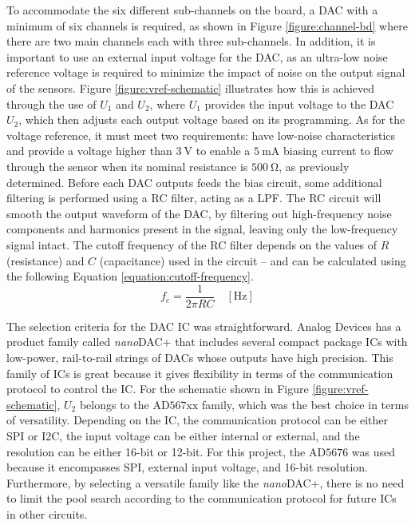 To accommodate the six different sub-channels on the board, a \ac{DAC} with a minimum of six channels is required, as shown in Figure \ref{figure:channel-bd} where there are two main channels each with three sub-channels. In addition, it is important to use an external input voltage for the \ac{DAC}, as an ultra-low noise reference voltage is required to minimize the impact of noise on the output signal of the sensors. Figure \ref{figure:vref-schematic} illustrates how this is achieved through the use of $U_1$ and $U_2$, where $U_1$ provides the input voltage to the \ac{DAC} $U_2$, which then adjusts each output voltage based on its programming. As for the voltage reference, it must meet two requirements: have low-noise characteristics and provide a voltage higher than $\mathrm{3~V}$ to enable a $\mathrm{5~mA}$ biasing current to flow through the sensor when its nominal resistance is $\mathrm{500~\Omega}$, as previously determined. Before each \ac{DAC} outputs feeds the bias circuit, some additional filtering is performed using a \ac{RC} filter, acting as a \ac{LPF}. The \ac{RC} circuit will smooth the output waveform of the \ac{DAC}, by filtering out high-frequency noise components and harmonics present in the signal, leaving only the low-frequency signal intact. The cutoff frequency of the \ac{RC} filter depends on the values of $R$ (resistance) and $C$ (capacitance) used in the circuit -- and can be calculated using the following Equation \ref{equation:cutoff-frequency}.
\begin{equation}
    f_c = \frac{1}{2\pi RC} \quad [\mathrm{Hz}]
    \label{equation:cutoff-frequency}
\end{equation}

The selection criteria for the \ac{DAC} \ac{IC} was straightforward. Analog Devices has a product family called \textit{nano}DAC+ that includes several compact package \ac{IC}s with low-power, rail-to-rail strings of \ac{DAC}s whose outputs have high precision. This family of \ac{IC}s is great because it gives flexibility in terms of the communication protocol to control the \ac{IC}. For the schematic shown in Figure \ref{figure:vref-schematic}, $U_2$ belongs to the $\mathrm{AD567xx}$ family, which was the best choice in terms of versatility. Depending on the \ac{IC}, the communication protocol can be either \ac{SPI} or \ac{I2C}, the input voltage can be either internal or external, and the resolution can be either 16-bit or 12-bit. For this project, the $\mathrm{AD5676}$ was used because it encompasses \ac{SPI}, external input voltage, and 16-bit resolution. Furthermore, by selecting a versatile family like the \textit{nano}DAC+, there is no need to limit the pool search according to the communication protocol for future \ac{IC}s in other circuits.

